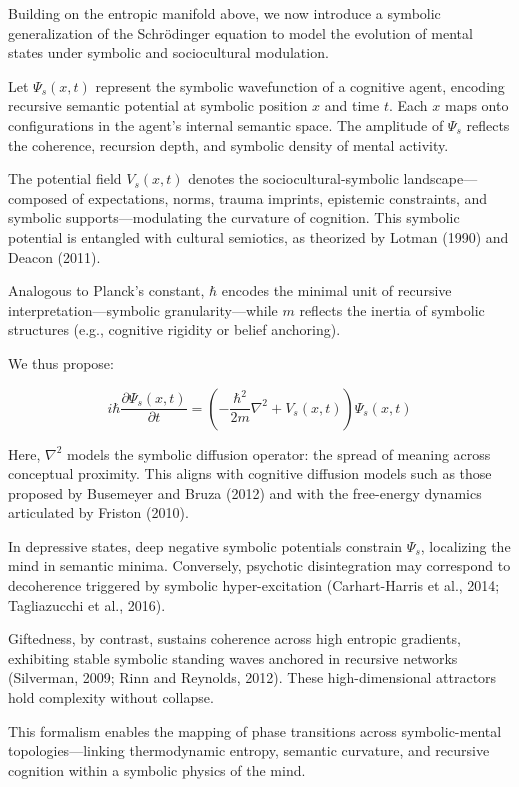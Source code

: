 Building on the entropic manifold above, we now introduce a symbolic generalization of the Schrödinger equation to model the evolution of mental states under symbolic and sociocultural modulation.

Let \( \Psi_s(x, t) \) represent the symbolic wavefunction of a cognitive agent, encoding recursive semantic potential at symbolic position \( x \) and time \( t \). Each \( x \) maps onto configurations in the agent's internal semantic space. The amplitude of \( \Psi_s \) reflects the coherence, recursion depth, and symbolic density of mental activity.

The potential field \( V_s(x, t) \) denotes the sociocultural-symbolic landscape—composed of expectations, norms, trauma imprints, epistemic constraints, and symbolic supports—modulating the curvature of cognition. This symbolic potential is entangled with cultural semiotics, as theorized by Lotman (1990) and Deacon (2011).

Analogous to Planck’s constant, \( \hbar \) encodes the minimal unit of recursive interpretation—symbolic granularity—while \( m \) reflects the inertia of symbolic structures (e.g., cognitive rigidity or belief anchoring).

We thus propose:

\[
i\hbar \frac{\partial \Psi_s(x, t)}{\partial t} = \left( -\frac{\hbar^2}{2m} \nabla^2 + V_s(x, t) \right) \Psi_s(x, t)
\]

Here, \( \nabla^2 \) models the symbolic diffusion operator: the spread of meaning across conceptual proximity. This aligns with cognitive diffusion models such as those proposed by Busemeyer and Bruza (2012) and with the free-energy dynamics articulated by Friston (2010).

In depressive states, deep negative symbolic potentials constrain \( \Psi_s \), localizing the mind in semantic minima. Conversely, psychotic disintegration may correspond to decoherence triggered by symbolic hyper-excitation (Carhart-Harris et al., 2014; Tagliazucchi et al., 2016).

Giftedness, by contrast, sustains coherence across high entropic gradients, exhibiting stable symbolic standing waves anchored in recursive networks (Silverman, 2009; Rinn and Reynolds, 2012). These high-dimensional attractors hold complexity without collapse.

This formalism enables the mapping of phase transitions across symbolic-mental topologies—linking thermodynamic entropy, semantic curvature, and recursive cognition within a symbolic physics of the mind.